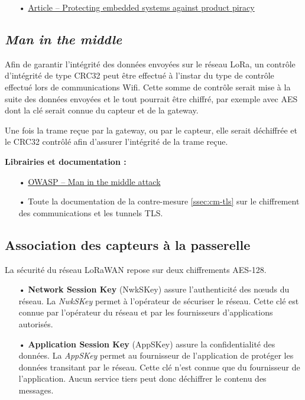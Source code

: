 \begin{itemize}
\item[•] \href{https://www.aisec.fraunhofer.de/content/dam/aisec/Dokumente/Publikationen/Studien_TechReports/englisch/Whitepaper_ProductProtection.pdf}{Article -- Protecting embedded systems against product piracy}
\end{itemize}

\subsection{\emph{Man in the middle}}
\label{ssec:cm-mitm}

Afin de garantir l'intégrité des données envoyées sur le réseau LoRa, un contrôle d'intégrité de type CRC32 peut être effectué à l'instar du type de contrôle effectué lors de communications Wifi. Cette somme de contrôle serait mise à la suite des données envoyées et le tout pourrait être chiffré, par exemple avec AES dont la clé serait connue du capteur et de la gateway.

Une fois la trame reçue par la gateway, ou par le capteur, elle serait déchiffrée et le CRC32 contrôlé afin d'assurer l'intégrité de la trame reçue.

\medskip
\textbf{Librairies et documentation :}

\begin{itemize}
\item[•] \href{https://www.owasp.org/index.php/Man-in-the-middle_attack}{OWASP -- Man in the middle attack}
\item[•] Toute la documentation de la contre-mesure \ref{ssec:cm-tls} sur le chiffrement des communications et les tunnels TLS.
\end{itemize}

\subsection{Association des capteurs à la passerelle}
\label{ssec:cm-association}

La sécurité du réseau LoRaWAN repose sur deux chiffrements AES-128.

\begin{itemize}
\item[•] \textbf{Network Session Key} (NwkSKey) assure l'authenticité des nœuds du réseau. La \emph{NwkSKey} permet à l'opérateur de sécuriser le réseau. Cette clé est connue par l'opérateur du réseau et par les fournisseurs d'applications autorisés.
\item[•] \textbf{Application Session Key} (AppSKey) assure la confidentialité des données. La \emph{AppSKey} permet au fournisseur de l'application de protéger les données transitant par le réseau. Cette clé n'est connue que du fournisseur de l'application. Aucun service tiers peut donc déchiffrer le contenu des messages.
\end{itemize}

